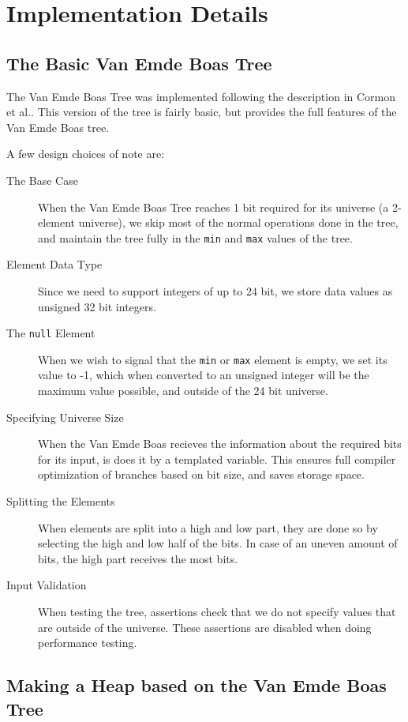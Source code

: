 \section{Implementation Details}

\subsection{The Basic Van Emde Boas Tree}

The Van Emde Boas Tree was implemented following the description in Cormon et al.\cite{Cormen}. This version of the tree is fairly basic, but provides the full features of the Van Emde Boas tree.

A few design choices of note are:

\begin{description}
\item[The Base Case] When the Van Emde Boas Tree reaches 1 bit required for its universe (a 2-element universe), we skip most of the normal operations done in the tree, and maintain the tree fully in the \texttt{min} and \texttt{max} values of the tree.
\item[Element Data Type] Since we need to support integers of up to 24 bit, we store data values as unsigned 32 bit integers.
\item[The \texttt{null} Element] When we wish to signal that the \texttt{min} or \texttt{max} element is empty, we set its value to -1, which when converted to an unsigned integer will be the maximum value possible, and outside of the 24 bit universe.
\item[Specifying Universe Size] When the Van Emde Boas recieves the information about the required bits for its input, is does it by a templated variable. This ensures full compiler optimization of branches based on bit size, and saves storage space.
\item[Splitting the Elements] When elements are split into a high and low part, they are done so by selecting the high and low half of the bits. In case of an uneven amount of bits, the high part receives the most bits.
\item[Input Validation] When testing the tree, assertions check that we do not specify values that are outside of the universe. These assertions are disabled when doing performance testing. 
\end{description}

\subsection{Making a Heap based on the Van Emde Boas Tree}

